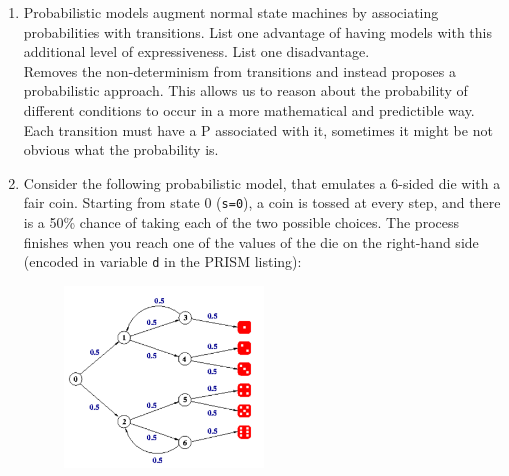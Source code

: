 \documentclass{article}
\begin{document}
\begin{enumerate}
\item Probabilistic models augment normal state machines by associating probabilities with transitions. List one advantage of having models with this additional level of expressiveness. List one disadvantage.\\
  Removes the non-determinism from transitions and instead proposes a probabilistic approach. This allows us to reason about the probability of different conditions to occur in a more mathematical and predictible way.\\
  Each transition must have a P associated with it, sometimes it might be not obvious what the probability is.\\
\item Consider the following probabilistic model, that emulates a 6-sided die with a fair coin. Starting from state 0 ({\tt s=0}), a coin is tossed at every step, and there is a 50\% chance of taking each of the two possible choices. The process finishes when you reach one of the values of the die on the right-hand side (encoded in variable {\tt d} in the PRISM listing):

\begin{figure}[!h]
\centering
\includegraphics[width=0.5\textwidth]{dice}
\end{figure}



\end{enumerate}
\end{document}
